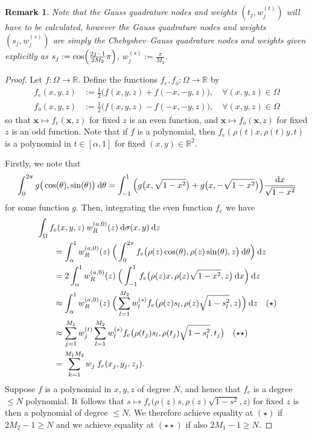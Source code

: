 \documentclass[11pt, oneside]{article}   	%
\newcommand{\half}{\frac{1}{2}}
\newcommand{\R}{\mathbb{R}}
\newcommand{\genjac}{R}
\newcommand{\genjacw}{w_\genjac}
\newcommand{\xvec}{\mathbf{x}}
\newtheorem*{remark}{Remark}
\begin{document}
\begin{remark} 
	Note that the Gauss quadrature nodes and weights $(t_j, w_j^{(t)})$ will have to be calculated, however the Gauss quadrature nodes and weights $(s_j, w_j^{(s)})$ are simply the Chebyshev--Gauss quadrature nodes and weights given explicitly \cite[3.5.23]{DLMF} as $s_j := \cos \fpr(\frac{2j - 1}{2M_2} \pi)$, $w_j^{(s)} := \frac{\pi}{M_2}$.
\end{remark}

\begin{proof}
Let $f : \Omega \to \R$. Define the functions $f_e, f_o : \Omega \to \R$ by 
\begin{align*}
	f_e(x,y,z) &:= \half \Big(f(x, y,z) + f(-x, -y,z)\Big), \quad \forall (x,y,z) \in \Omega\\
	f_o(x,y,z) &:= \half \Big(f(x, y,z) - f(-x, -y,z)\Big), \quad \forall (x,y,z) \in \Omega
\end{align*}
so that $\xvec \mapsto f_e(\xvec, z)$ for fixed $z$ is an even function, and $\xvec \mapsto f_o(\xvec, z)$ for fixed $z$ is an odd function. Note that if $f$ is a polynomial, then $f_e(\rho(t)x, \rho(t)y, t)$ is a polynomial in $t \in [\alpha,1]$ for fixed $(x,y) \in \R^2$. 

Firstly, we note that
\begin{align*}
	\int_0^{2\pi} g\big(\cos(\theta), \sin(\theta)\big) \: {\rm d} \theta = \int_{-1}^1 \Big( g\big(x, \sqrt{1-x^2}\big) + g\big(x, -\sqrt{1-x^2}\big) \Big) \frac{{\rm d} x}{\sqrt{1-x^2}}
\end{align*}
for some function $g$. Then, integrating the even function $f_e$ we have
\begin{align*}
	&\int_\Omega f_e(x,y,z) \: \genjacw^{(a,0)}(z) \: \D \sigma(x,y) \: \D z \\
	&\quad \quad = \int_\alpha^1 \genjacw^{(a,0)}(z) \: \Big( \int_0^{2\pi} f_e\big(\rho(z)\cos(\theta),\rho(z)\sin(\theta), z\big) \: \D \theta \Big) \: \D z \\
	&\quad \quad = 2 \int_\alpha^1 \genjacw^{(a,0)}(z) \: \Big( \int_{-1}^1 f_e\big(\rho(z)x,\rho(z)\sqrt{1-x^2}, z\big) \: \D x \Big) \: \D z \\
	&\quad \quad \approx \int_\alpha^1 \genjacw^{(a,0)}(z) \: \Big( \sum_{l=1}^{M_2} w_l^{(s)} f_e\big(\rho(z) s_l, \rho(z) \sqrt{1 - s_l^2}, z\big) \Big) \: \D z \quad (\star) \\
	&\quad \quad \approx \sum_{j=1}^{M_1} w_j^{(t)} \sum_{l=1}^{M_2} w_l^{(s)} f_e\big(\rho(t_j) s_l, \rho(t_j) \sqrt{1 - s_l^2}, t_j\big) \quad (\star \star) \\
	&\quad \quad = \sum_{k=1}^{M_1 M_2}  w_j \: f_e(x_j, y_j, z_j).
\end{align*}
Suppose $f$ is a polynomial in $x,y,z$ of degree $N$, and hence that $f_e$ is a degree $\le N$ polynomial. It follows that $s \mapsto f_e\big(\rho(z)s,\rho(z)\sqrt{1-s^2}, z\big)$ for fixed $z$ is then a polynomial of degree $\le N$. We therefore achieve equality at $(\star)$ if $2M_2 - 1 \ge N$ and we achieve equality at $(\star \star)$ if also $2M_1 - 1 \ge N$.


\end{proof}
\end{document}
